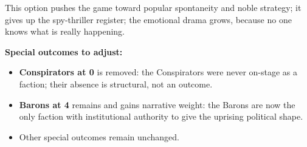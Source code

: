 This option pushes the game toward popular spontaneity and noble
strategy; it gives up the spy-thriller register; the emotional
drama grows, because no one knows what is really happening.

\textbf{Special outcomes to adjust:}
\begin{itemize}[nosep]
  \item \textbf{Conspirators at 0} is removed: the Conspirators
    were never on-stage as a faction; their absence is structural,
    not an outcome.
  \item \textbf{Barons at 4} remains and gains narrative weight:
    the Barons are now the only faction with institutional
    authority to give the uprising political shape.
  \item Other special outcomes remain unchanged.
\end{itemize}


\filettodoppio
